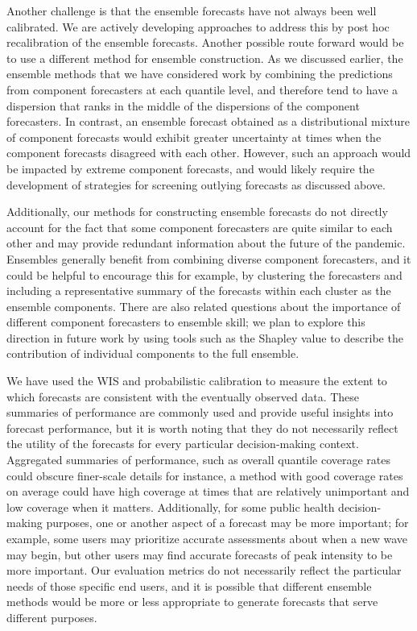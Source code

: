 \documentclass[11pt,3p,authoryear]{elsarticle}
\begin{document}
Another challenge is that the ensemble forecasts have not always been well calibrated.
We are actively developing approaches to address this by post hoc recalibration of the ensemble forecasts.
Another possible route forward would be to use a different method for ensemble construction.
As we discussed earlier, the ensemble methods that we have considered work by combining the predictions from component forecasters at each quantile level, and therefore tend to have a dispersion that ranks in the middle of the dispersions of the component forecasters.
In contrast, an ensemble forecast obtained as a distributional mixture of component forecasts would exhibit greater uncertainty at times when the component forecasts disagreed with each other.
However, such an approach would be impacted by extreme component forecasts, and would likely require the development of strategies for screening outlying forecasts as discussed above.

Additionally, our methods for constructing ensemble forecasts do not directly account for the fact that some component forecasters are quite similar to each other and may provide redundant information about the future of the pandemic.
Ensembles generally benefit from combining diverse component forecasters, and it could be helpful to encourage this \textemdash for example, by clustering the forecasters and including a representative summary of the forecasts within each cluster as the ensemble components.
There are also related questions about the importance of different component forecasters to ensemble skill; we plan to explore this direction in future work by using tools such as the Shapley value to describe the contribution of individual components to the full ensemble.

We have used the WIS and probabilistic calibration to measure the extent to which forecasts are consistent with the eventually observed data. These summaries of performance are commonly used and provide useful insights into forecast performance, but it is worth noting that they do not necessarily reflect the utility of the forecasts for every particular decision-making context. Aggregated summaries of performance, such as overall quantile coverage rates could obscure finer-scale details \textemdash for instance, a method with good coverage rates on average could have high coverage at times that are relatively unimportant and low coverage when it matters. Additionally, for some public health decision-making purposes, one or another aspect of a forecast may be more important; for example, some users may prioritize accurate assessments about when a new wave may begin, but other users may find accurate forecasts of peak intensity to be more important. Our evaluation metrics do not necessarily reflect the particular needs of those specific end users, and it is possible that different ensemble methods would be more or less appropriate to generate forecasts that serve different purposes.
\end{document}
